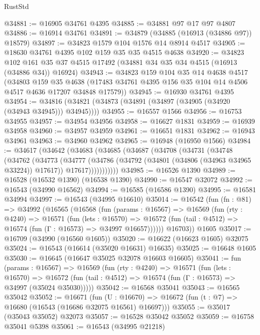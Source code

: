\begin{lexlean}{RustStd}
\begin{coremodule}
@34881 := @16905 @34761 @4395
@34885 := @34881 @97 @17 @97 @4807
@34886 := @16914 @34761
@34891 := @34879 (@34885 (@16913 (@34886 @97)) @18579)
@34897 := @34823 @1579 @104 @1576 @14 @8914 @4517
@34905 := @18630 @34761 @4395 @102 @159 @35 @35 @4515 @4638
@34920 := @34823
    @102
    @161
    @35
    @37
    @4515
    @17492
    (@34881 @34 @35 @34 @4515 (@16913 (@34886 @34)) @16924)
@34943 := @34823
    @159
    @104
    @35
    @14
    @4638
    @4517
    (@34803
      @159
      @35
      @4638
      (@17483 @34761 @4395 @156 @35 @104 @14 @4506 @4517 @4636 @17207 @34848 @17579))
@34945 := @16930 @34761 @4395
@34954 := @34816 (@34821 (@34873 (@34891 (@34897 (@34905 (@34920 (@34943 @34945))) @34945))))
@34955 := @16557 @1566
@34956 := @16753 @34955
@34957 := @34954 @34956
@34958 := @16627 @1831
@34959 := @16939 @34958
@34960 := @34957 @34959
@34961 := @16651 @1831
@34962 := @16943 @34961
@34963 := @34960 @34962
@34965 := @16948 (@16950 @1566)
@34984 := @34617
    (@34642
      (@34683
        (@34685
          (@34687
            (@34708
              (@34731
                (@34748
                  (@34762
                    (@34773
                      (@34777
                        (@34786
                          (@34792 (@34801 (@34806 (@34963 @34965 @33224)) @17617))
                          @17617)))))))))))
@34985 := @16526 @1390
@34989 := @16528 (@16532 @1390) (@16538 @1390)
@34990 := @16547 @32072
@34992 := @16543 (@34990 @16562)
@34994 := @16585 (@16586 @1390)
@34995 := @16581 @34994
@34997 := @16543 (@34995 @16610)
@35014 := @16542
    (fun (fn : @81) =>
    @34992
      (@16565
        (@16568
          (fun (params : @16567) =>
          @16569
            (fun (rty : @4240) =>
            @16571
              (fun (lets : @16570) =>
              @16572 (fun (tail : @4512) => @16574 (fun (Γ : @16573) => @34997 @16657))))))
        @16703))
    @1605
@35017 := @16709 (@34990 (@16560 @1605))
@35020 := @16622 (@16623 @1605) @32075
@35024 := @16543 (@16614 (@35020 @16631) @16635)
@35025 := @16648 @1605
@35030 := @16645 (@16647 @35025 @32078 @16603 @16605)
@35041 := fun (params : @16567) =>
  @16569
    (fun (rty : @4240) =>
    @16571
      (fun (lets : @16570) =>
      @16572 (fun (tail : @4512) => @16574 (fun (Γ : @16573) => @34997 (@35024 @35030)))))
@35042 := @16568 @35041
@35043 := @16565 @35042
@35052 := @16671
    (fun (U : @16670) => @16672 (fun (t : @7) => @16680 (@16543 (@16686 @32075 @16561) @16697)))
@35055 := @35017 (@35043 @35052) @32073
@35057 := @16528 @35042 @35052
@35059 := @16758 @35041 @5398
@35061 := @16543 (@34995 @21218)

\end{coremodule}
\end{lexlean}
